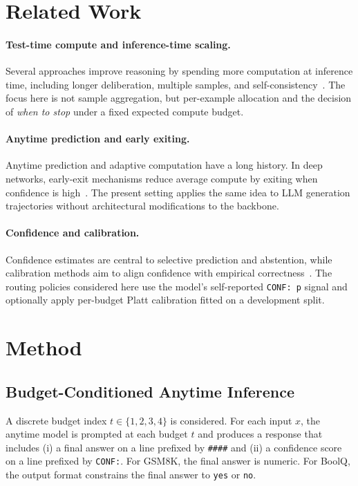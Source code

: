 \documentclass[conference]{IEEEtran}
\begin{document}
\section{Related Work}
\paragraph{Test-time compute and inference-time scaling.}
Several approaches improve reasoning by spending more computation at inference time, including longer deliberation, multiple samples, and self-consistency~\cite{wang2022selfconsistency}. The focus here is not sample aggregation, but per-example allocation and the decision of \emph{when to stop} under a fixed expected compute budget.

\paragraph{Anytime prediction and early exiting.}
Anytime prediction and adaptive computation have a long history. In deep networks, early-exit mechanisms reduce average compute by exiting when confidence is high~\cite{xin2020deebbert}. The present setting applies the same idea to LLM generation trajectories without architectural modifications to the backbone.

\paragraph{Confidence and calibration.}
Confidence estimates are central to selective prediction and abstention, while calibration methods aim to align confidence with empirical correctness~\cite{guo2017calibration,kadavath2022know}. The routing policies considered here use the model's self-reported \texttt{CONF: p} signal and optionally apply per-budget Platt calibration fitted on a development split.

\section{Method}
\subsection{Budget-Conditioned Anytime Inference}
A discrete budget index $t\in\{1,2,3,4\}$ is considered. For each input $x$, the anytime model is prompted at each budget $t$ and produces a response that includes (i) a final answer on a line prefixed by \texttt{\#\#\#\#} and (ii) a confidence score on a line prefixed by \texttt{CONF:}. For GSM8K, the final answer is numeric. For BoolQ, the output format constrains the final answer to \texttt{yes} or \texttt{no}.
\end{document}
